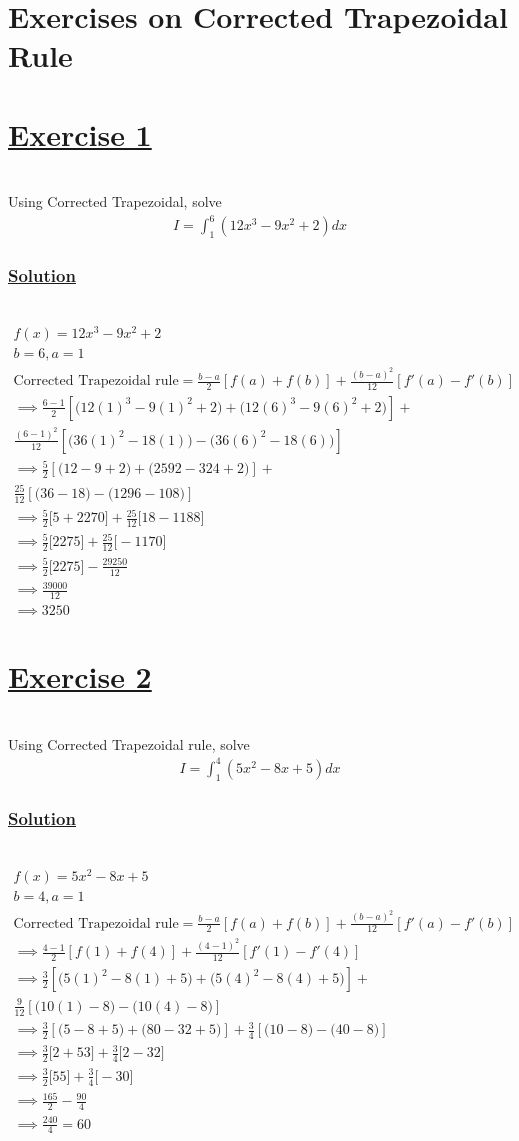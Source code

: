 \documentclass[12pt]{report}
\newcommand{\ubt}[1]{\textbf{\underline{#1}}}
\newcommand{\sps}{\\[0.2cm]}
\newcommand{\spn}[1]{\\[#1cm]}
\newcommand{\solution}{\subsubsection{\ubt{Solution}}{~}\spn{-1}}
\newcommand{\exercise}[1]{\section*{\ubt{Exercise #1}}{~}\spn{-1}}
\begin{document}
	\section{Exercises on Corrected Trapezoidal Rule}
		\exercise{1}
	Using Corrected Trapezoidal, solve
	\begin{eqnarray*}
		I = \int_1^6 (12x^3 - 9x^2 + 2) dx
	\end{eqnarray*}
	\solution
	\begin{gather*}
		f(x) = 12x^3 - 9x^2 + 2\\
		b=6, a=1\\
		\text{Corrected Trapezoidal rule} = \frac{b-a}{2}\left[f(a) + f(b)\right] + \frac{(b-a)^2}{12}\left[f'(a) - f'(b)\right]\\
		\implies \frac{6-1}{2}\left[ \bigg(12(1)^3 - 9(1)^2 + 2\bigg) + \bigg(12(6)^3 - 9(6)^2 + 2\bigg)\right] +\\ \frac{(6-1)^2}{12}\left[\bigg(36(1)^2 - 18(1)\bigg) - \bigg(36(6)^2 - 18(6)\bigg)\right]\sps
		\implies \frac{5}{2}\left[ \bigg(12-9 + 2\bigg) + \bigg(2592 - 324 + 2\bigg)\right] +\\ \frac{25}{12}\left[\bigg(36-18\bigg) - \bigg(1296 - 108\bigg)\right]\sps
		\implies \frac{5}{2}\bigg[5+2270\bigg] + \frac{25}{12}\bigg[18-1188\bigg]\sps
		\implies \frac{5}{2}\bigg[2275\bigg] + \frac{25}{12}\bigg[-1170\bigg]\sps
		\implies \frac{5}{2}\bigg[2275\bigg] - \frac{29250}{12}\sps
		\implies \frac{39000}{12}\sps
		\implies 3250
	\end{gather*}
	\newpage
	\exercise{2}
	Using Corrected Trapezoidal rule, solve
	\begin{gather*}
		I=\int_1^4(5x^2-8x+5)dx
	\end{gather*}
	\solution
	\begin{gather*}
		f(x) = 5x^2 - 8x + 5\\
		b=4, a=1\\
		\text{Corrected Trapezoidal rule} = \frac{b-a}{2}\left[f(a) + f(b)\right] + \frac{(b-a)^2}{12}\left[f'(a) - f'(b)\right] \\
		\implies \frac{4-1}{2}\left[f(1) + f(4)\right] + \frac{(4-1)^2}{12}\left[f'(1) - f'(4)\right]\\
		\implies \frac{3}{2}\left[\bigg(5(1)^2 - 8(1) + 5\bigg) + \bigg(5(4)^2 - 8(4)+5\bigg)\right] + \\
		\frac{9}{12}\left[\bigg(10(1) - 8\bigg) - \bigg(10(4) - 8\bigg)\right] \sps
		\implies \frac{3}{2}\left[\bigg(5 - 8 + 5\bigg) + \bigg(80 - 32+5\bigg)\right] + \frac{3}{4}\left[\bigg(10 - 8\bigg) - \bigg(40 - 8\bigg)\right] \sps
		\implies \frac{3}{2}\bigg[2+53\bigg] + \frac{3}{4}\bigg[2-32\bigg] \sps
		\implies \frac{3}{2}\bigg[55\bigg] + \frac{3}{4}\bigg[-30\bigg] \sps
		\implies \frac{165}{2} - \frac{90}{4} \sps
		\implies \frac{240}{4} = 60
	\end{gather*}
	
\end{document}
